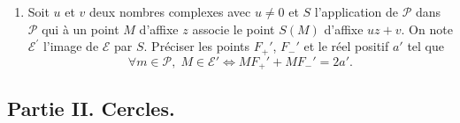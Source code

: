 \begin{enumerate}
  \setcounter{enumi}{\value{numquestion}}
  \item Soit $u$ et $v$ deux nombres complexes avec $u\neq 0$ et $S$ l'application de $\mathcal P$ dans $\mathcal P$ qui à un point $M$ d'affixe $z$ associe le point $S(M)$ d'affixe $uz+v$.\newline
 On note $\mathcal E ^\prime$ l'image de $\mathcal E$ par $S$. Préciser les points $F_+'$, $F_-'$ et le réel positif $a'$ tel que
\[
\forall m \in \mathcal{P},\;  M \in \mathcal{E}' \Leftrightarrow MF_+' + MF_-' = 2a'.
\]
\end{enumerate}

\subsection*{Partie II. Cercles.}
